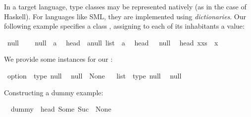 \begin{isabellebody}
\begin{isamarkuptext}
  In a target language, type classes may be represented
  natively (as in the case of Haskell). For languages
  like SML, they are implemented using \emph{dictionaries}.
  Our following example specifies a class ,
  assigning to each of its inhabitants a  value:%
\end{isamarkuptext}%
\isamarkuptrue%
\isamarkupfalse%
\ null\ {\isacharequal}\isanewline
\ \ \ null\ {\isacharcolon}{\isacharcolon}\ {\isacharprime}a\isanewline
\isanewline
{}\isamarkupfalse%
\isanewline
\ \ head\ {\isacharcolon}{\isacharcolon}\ {\isachardoublequoteopen}{\isacharprime}a{\isasymColon}null\ list\ {\isasymRightarrow}\ {\isacharprime}a{\isachardoublequoteclose}\isanewline
\isanewline
{}\isamarkupfalse%
\isanewline
\ \ {\isachardoublequoteopen}head\ {\isacharbrackleft}{\isacharbrackright}\ {\isacharequal}\ null{\isachardoublequoteclose}\isanewline
\ \ {\isachardoublequoteopen}head\ {\isacharparenleft}x{\isacharhash}xs{\isacharparenright}\ {\isacharequal}\ x{\isachardoublequoteclose}%
\begin{isamarkuptext}%
We provide some instances for our :%
\end{isamarkuptext}%
\isamarkuptrue%
\isamarkupfalse%
\ option\ {\isacharcolon}{\isacharcolon}\ {\isacharparenleft}type{\isacharparenright}\ null\isanewline
\ \ {\isachardoublequoteopen}null\ {\isasymequiv}\ None{\isachardoublequoteclose}%
\isadelimproof
\ %
\endisadelimproof
%
\isatagproof
\isacommand{{\isachardot}{\isachardot}}\isamarkupfalse%
%
\endisatagproof
{\isafoldproof}%
%
\isadelimproof
%
\endisadelimproof
\isanewline
\isanewline
{}\isamarkupfalse%
\ list\ {\isacharcolon}{\isacharcolon}\ {\isacharparenleft}type{\isacharparenright}\ null\isanewline
\ \ {\isachardoublequoteopen}null\ {\isasymequiv}\ {\isacharbrackleft}{\isacharbrackright}{\isachardoublequoteclose}%
\isadelimproof
\ %
\endisadelimproof
%
\isatagproof
\isacommand{{\isachardot}{\isachardot}}\isamarkupfalse%
%
\endisatagproof
{\isafoldproof}%
%
\isadelimproof
%
\endisadelimproof
%
\begin{isamarkuptext}%
Constructing a dummy example:%
\end{isamarkuptext}%
\isamarkuptrue%
\isamarkupfalse%
\isanewline
\ \ {\isachardoublequoteopen}dummy\ {\isacharequal}\ head\ {\isacharbrackleft}Some\ {\isacharparenleft}Suc\ {}{\isacharparenright}{\isacharcomma}\ None{\isacharbrackright}{\isachardoublequoteclose}%
\begin{isamarkuptext}%

\end{isamarkuptext}
\end{isabellebody}
